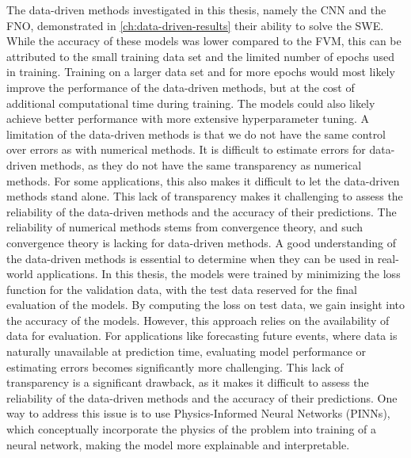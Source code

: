 The data-driven methods investigated in this thesis, namely the CNN and the FNO, demonstrated in \autoref{ch:data-driven-results} their ability to solve the SWE.
While the accuracy of these models was lower compared to the FVM, this can be attributed to the small training data set and the limited number of epochs used in training.
Training on a larger data set and for more epochs would most likely improve the performance of the data-driven methods, but at the cost of additional computational time during training.
The models could also likely achieve better performance with more extensive hyperparameter tuning.
A limitation of the data-driven methods is that we do not have the same control over errors as with numerical methods.
It is difficult to estimate errors for data-driven methods, as they do not have the same transparency as numerical methods.
For some applications, this also makes it difficult to let the data-driven methods stand alone.
This lack of transparency makes it challenging to assess the reliability of the data-driven methods and the accuracy of their predictions.
The reliability of numerical methods stems from convergence theory, and such convergence theory is lacking for data-driven methods.
A good understanding of the data-driven methods is essential to determine when they can be used in real-world applications.
In this thesis, the models were trained by minimizing the loss function for the validation data, with the test data reserved for the final evaluation of the models.
By computing the loss on test data, we gain insight into the accuracy of the models.
However, this approach relies on the availability of data for evaluation.
For applications like forecasting future events, where data is naturally unavailable at prediction time, evaluating model performance or estimating errors becomes significantly more challenging.
This lack of transparency is a significant drawback, as it makes it difficult to assess the reliability of the data-driven methods and the accuracy of their predictions.
One way to address this issue is to use Physics-Informed Neural Networks (PINNs), which conceptually incorporate the physics of the problem into training of a neural network, making the model more explainable and interpretable.

